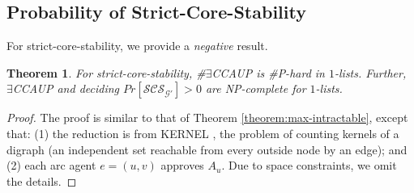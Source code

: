 \documentclass[letterpaper]{article} %
\newtheorem{theorem}{Theorem}
\begin{document}
\subsection{Probability of Strict-Core-Stability}
\label{sec:Probability of Strict-Core-Stablity}
For strict-core-stability, we provide a \textit{negative} result.
\begin{theorem}
\label{theorem:strict-core-stable}
For strict-core-stability, \#$\exists$CCAUP is \#P-hard in $1$-lists. Further, $\exists$CCAUP and deciding $Pr[\mathcal{SCS}_{\mathcal{G}'}]>0$ are NP-complete for $1$-lists.
\end{theorem}
\begin{proof}
The proof is similar to that of Theorem \ref{theorem:max-intractable}, except that: (1) the reduction is from KERNEL \cite{szwarcfiter1994enumerating}, the problem of counting kernels of a digraph (an independent set reachable from every outside node by an edge); and (2) each arc agent $e = (u,v)$ approves $A_u$. Due to space constraints, we omit the details.
\end{proof}
\end{document}
